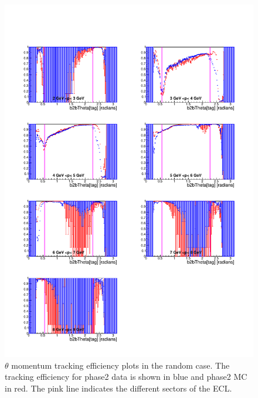 \documentclass[a4paper,11pt,twosided,final,german,openbib,pdftex,listof=totoc,bibliography=totoc]{scrbook}
\begin{document}
\begin{figure}[!htbp]
	\centering
	\includegraphics[width=\textwidth]{Plots/master/xPMThetaRandom}
	\caption[Momentum $\theta$ Random Efficiency Phase2]{$\theta$ momentum tracking efficiency plots in the random case. The tracking efficiency for phase2 data is shown in blue and phase2 MC in red. The pink line indicates the different sectors of the ECL.}
		\label{plt:xPMThetaRandom}
\end{figure}
\end{document}
